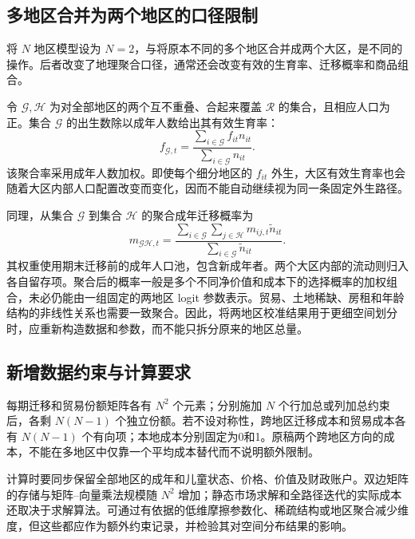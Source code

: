 \documentclass[UTF8,a4paper,zihao=-4,fontset=windows]{ctexart}
\numberwithin{equation}{section}
\begin{document}
\subsection{多地区合并为两个地区的口径限制}
将 $N$ 地区模型设为 $N=2$，与将原本不同的多个地区合并成两个大区，是不同的操作。后者改变了地理聚合口径，通常还会改变有效的生育率、迁移概率和商品组合。

令 $\mathcal G,\mathcal H$ 为对全部地区的两个互不重叠、合起来覆盖 $\mathcal R$ 的集合，且相应人口为正。集合 $\mathcal G$ 的出生数除以成年人数给出其有效生育率：
\begin{equation}
  f_{\mathcal G,t}
    =\frac{\sum_{i\in\mathcal G}f_{it}n_{it}}
           {\sum_{i\in\mathcal G}n_{it}}.
  \label{eq:app-aggregate-fertility}
\end{equation}
该聚合率采用成年人数加权。即使每个细分地区的 $f_{it}$ 外生，大区有效生育率也会随着大区内部人口配置改变而变化，因而不能自动继续视为同一条固定外生路径。

同理，从集合 $\mathcal G$ 到集合 $\mathcal H$ 的聚合成年迁移概率为
\begin{equation}
  m_{\mathcal G\mathcal H,t}
    =\frac{\sum_{i\in\mathcal G}\sum_{j\in\mathcal H}
                  m_{ij,t}\widetilde n_{it}}
           {\sum_{i\in\mathcal G}\widetilde n_{it}}.
  \label{eq:app-aggregate-migration}
\end{equation}
其权重使用期末迁移前的成年人口池，包含新成年者。两个大区内部的流动则归入各自留存项。聚合后的概率一般是多个不同净价值和成本下的选择概率的加权组合，未必仍能由一组固定的两地区 logit 参数表示。贸易、土地稀缺、房租和年龄结构的非线性关系也需要一致聚合。因此，将两地区校准结果用于更细空间划分时，应重新构造数据和参数，而不能只拆分原来的地区总量。

\subsection{新增数据约束与计算要求}
每期迁移和贸易份额矩阵各有 $N^2$ 个元素；分别施加 $N$ 个行加总或列加总约束后，各剩 $N(N-1)$ 个独立份额。若不设对称性，跨地区迁移成本和贸易成本各有 $N(N-1)$ 个有向项；本地成本分别固定为0和1。原稿两个跨地区方向的成本，不能在多地区中仅靠一个平均成本替代而不说明额外限制。

计算时要同步保留全部地区的成年和儿童状态、价格、价值及财政账户。双边矩阵的存储与矩阵--向量乘法规模随 $N^2$ 增加；静态市场求解和全路径迭代的实际成本还取决于求解算法。可通过有依据的低维摩擦参数化、稀疏结构或地区聚合减少维度，但这些都应作为额外约束记录，并检验其对空间分布结果的影响。
\end{document}

